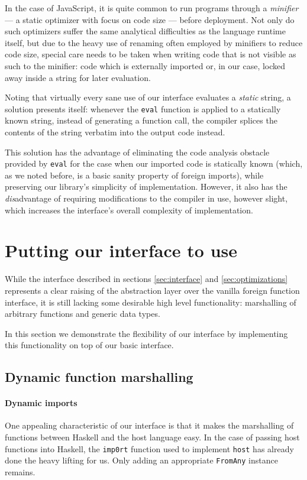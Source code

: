 \documentclass{sigplanconf}
\begin{document}
In the case of JavaScript, it is quite common to run programs through a
\emph{minifier} --- a static optimizer with focus on code size --- before
deployment. Not only do such optimizers suffer the same analytical
difficulties as the language runtime itself, but due to the heavy use of
renaming often employed by minifiers to reduce code size, special care needs
to be taken when writing code that is not visible as such to the minifier:
code which is externally imported or, in our case, locked away inside a string
for later evaluation.

Noting that virtually every sane use of our interface evaluates a \emph{static}
string, a solution presents itself: whenever the \lstinline!eval! function
is applied to a statically known string, instead of generating a function call,
the compiler splices the contents of the string verbatim into the output code
instead.

This solution has the advantage of eliminating the code analysis obstacle
provided by \lstinline!eval! for the case when our imported code is statically
known (which, as we noted before, is a basic sanity property of foreign
imports), while preserving our library's simplicity of implementation.
However, it also has the \emph{dis}advantage of requiring modifications to the
compiler in use, however slight, which increases the interface's overall
complexity of implementation.

\section{Putting our interface to use}
\label{sec:extensions}
While the interface described in sections \ref{sec:interface} and
\ref{sec:optimizations} represents a clear raising of the abstraction layer
over the vanilla foreign function interface, it is still lacking some
desirable high level functionality: marshalling of arbitrary functions and
generic data types.

In this section we demonstrate the flexibility of our interface by implementing
this functionality on top of our basic interface.

\subsection{Dynamic function marshalling}
\label{sec:marshalling-functions}
\paragraph{Dynamic imports}
One appealing characteristic of our interface is that it makes the marshalling
of functions between Haskell and the host language easy. In the case of
passing host functions into Haskell, the \lstinline!imp0rt! function used to
implement \lstinline!host! has already done the heavy lifting for us.
Only adding an appropriate \lstinline!FromAny! instance remains.
\end{document}
